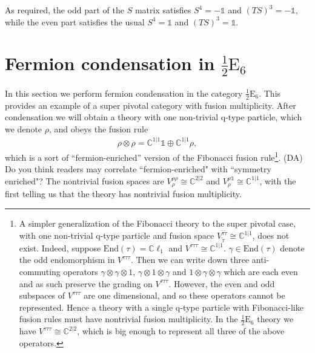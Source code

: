 \documentclass[12pt,a4paper]{article}
\newcommand{\tp}{\otimes}
\newcommand{\unit}{\mathds{1}}
\newcommand{\cc}{\mathbb{C}}
\newcommand{\kw}[1]{{\color{kwcolor}\footnotesize{(KW) #1}}}
\newcommand{\dave}[1]{{\color{ao(english)}\footnotesize{(DA) #1}}}
\newcommand{\halfesix}{\frac{1}{2}\text{E}_6}
\begin{document}
As required, the odd part of the $S$ matrix satisfies $S^4 = -\unit$ and $(TS)^3 = -\unit$, while the even part satisfies the usual $S^4 = \unit$ and $(TS)^3 = \unit$. 



\section{Fermion condensation in $\halfesix$} \label{halfesix}

In this section we perform fermion condensation in the category $\halfesix$.
This provides an example of a super pivotal category with fusion multiplicity.
After condensation we will obtain a theory with one non-trivial q-type particle, 
which we denote $\rho$, and obeys the fusion rule
\begin{align}
\rho \tp \rho = \mathbb{C}^{1|1} \mathds{1} \oplus \mathbb{C}^{1|1} \rho,
\end{align}
which is a sort of ``fermion-enriched'' version of the Fibonacci fusion rule\footnote{A simpler generalization of the Fibonacci theory to the super pivotal case, with one non-trivial q-type particle and fusion space $V^{\tilde{\tau} \tilde{\tau}}_{\tilde {\tau}}\cong \mathbb{C}^{1|1}$, does not exist. Indeed, suppose $\text{End}(\tau) = \mathbb{C} \ell_1$ and $V^{\tau \tau \tau} \cong \mathbb{C}^{1|1}$.
$\gamma \in \text{End}(\tau)$ denote the odd endomorphism in $V^{\tau\tau\tau}$.
Then we can write down three anti-commuting operators $\gamma \tp \gamma \tp 1$, $\gamma \tp 1 \tp \gamma$ and $1\tp \gamma \tp \gamma$ which are each even and as such preserve the grading on $V^{\tau\tau\tau}$. 
However, the even and odd subspaces of $V^{\tau\tau\tau}$ are one dimensional, and so these operators cannot be represented.
Hence a theory with a single q-type particle with Fibonacci-like fusion rules must have nontrivial fusion multiplicity.
In the $\halfesix$ theory we have $V^{\tau\tau\tau} \cong \cc^{2|2}$, which is big enough to represent all three of the above operators.}.
\dave{Do you think readers may correlate ``fermion-enriched" with ``symmetry enriched"?}
The nontrivial fusion spaces are $V^{\rho\rho}_\rho \cong \cc^{2|2}$ and $V^{\rho\unit}_\rho \cong \cc^{1|1}$, with the first telling us that the theory has nontrivial fusion multiplicity. 
\end{document}
